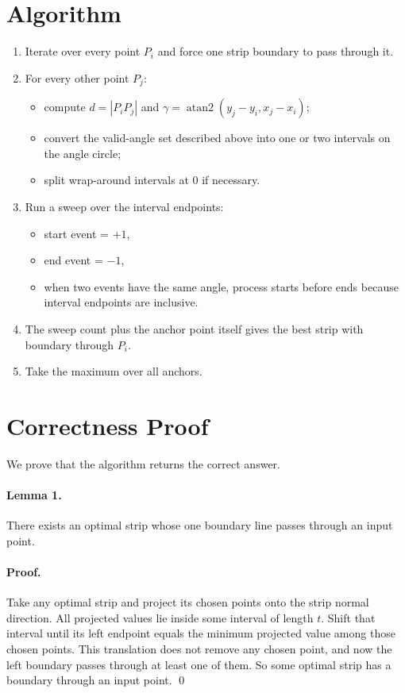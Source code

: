 \documentclass[11pt]{article}
\begin{document}
\section*{Algorithm}

\begin{enumerate}[leftmargin=*]
    \item Iterate over every point $P_i$ and force one strip boundary to pass through it.
    \item For every other point $P_j$:
    \begin{itemize}[leftmargin=*]
        \item compute $d=|P_iP_j|$ and $\gamma=\operatorname{atan2}(y_j-y_i, x_j-x_i)$;
        \item convert the valid-angle set described above into one or two intervals on the angle circle;
        \item split wrap-around intervals at $0$ if necessary.
    \end{itemize}
    \item Run a sweep over the interval endpoints:
    \begin{itemize}[leftmargin=*]
        \item start event = $+1$,
        \item end event = $-1$,
        \item when two events have the same angle, process starts before ends because interval endpoints are
        inclusive.
    \end{itemize}
    \item The sweep count plus the anchor point itself gives the best strip with boundary through $P_i$.
    \item Take the maximum over all anchors.
\end{enumerate}

\section*{Correctness Proof}

We prove that the algorithm returns the correct answer.

\paragraph{Lemma 1.}
There exists an optimal strip whose one boundary line passes through an input point.

\paragraph{Proof.}
Take any optimal strip and project its chosen points onto the strip normal direction.
All projected values lie inside some interval of length $t$.
Shift that interval until its left endpoint equals the minimum projected value among those chosen points.
This translation does not remove any chosen point, and now the left boundary passes through at least one of
them.
So some optimal strip has a boundary through an input point. \qed
\end{document}
